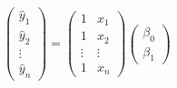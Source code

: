 \documentclass[convert={density=300,outext=.png}]{standalone}
\begin{document}
$
\left(
\begin{array}{c}
\hat{y}_1\\
\hat{y}_2\\
\vdots\\
\hat{y}_n
\end{array}
\right)
=
\left(
\begin{array}{cc}
1 & x_1 \\
1 & x_2 \\
\vdots & \vdots \\
1 & x_n
\end{array}
\right)
\left(
\begin{array}{c}
\beta_0 \\
\beta_1
\end{array}
\right)
$
\end{document}
